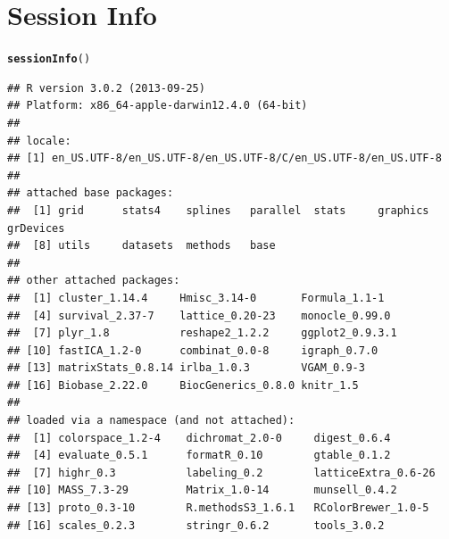 \documentclass[10pt,oneside]{article}\usepackage[]{graphicx}\usepackage[]{color}
\makeatletter
\newcommand{\hlstd}[1]{\textcolor[rgb]{0.345,0.345,0.345}{#1}}%
\newcommand{\hlkwd}[1]{\textcolor[rgb]{0.737,0.353,0.396}{\textbf{#1}}}%
\newenvironment{kframe}{%
 \def\at@end@of@kframe{}%
 \ifinner\ifhmode%
  \def\at@end@of@kframe{\end{minipage}}%
  \begin{minipage}{\columnwidth}%
 \fi\fi%
 \def\FrameCommand##1{\hskip\@totalleftmargin \hskip-\fboxsep
 \colorbox{shadecolor}{##1}\hskip-\fboxsep
     \hskip-\linewidth \hskip-\@totalleftmargin \hskip\columnwidth}%
 \MakeFramed {\advance\hsize-\width
   \@totalleftmargin\z@ \linewidth\hsize
   \@setminipage}}%
 {\par\unskip\endMakeFramed%
 \at@end@of@kframe}
\newenvironment{knitrout}{}{} %
\makeatother
\begin{document}
\section{Session Info}
\begin{knitrout}
\color{fgcolor}\begin{kframe}
\begin{alltt}
\hlkwd{sessionInfo}\hlstd{()}
\end{alltt}
\begin{verbatim}
## R version 3.0.2 (2013-09-25)
## Platform: x86_64-apple-darwin12.4.0 (64-bit)
## 
## locale:
## [1] en_US.UTF-8/en_US.UTF-8/en_US.UTF-8/C/en_US.UTF-8/en_US.UTF-8
## 
## attached base packages:
##  [1] grid      stats4    splines   parallel  stats     graphics  grDevices
##  [8] utils     datasets  methods   base     
## 
## other attached packages:
##  [1] cluster_1.14.4     Hmisc_3.14-0       Formula_1.1-1     
##  [4] survival_2.37-7    lattice_0.20-23    monocle_0.99.0    
##  [7] plyr_1.8           reshape2_1.2.2     ggplot2_0.9.3.1   
## [10] fastICA_1.2-0      combinat_0.0-8     igraph_0.7.0      
## [13] matrixStats_0.8.14 irlba_1.0.3        VGAM_0.9-3        
## [16] Biobase_2.22.0     BiocGenerics_0.8.0 knitr_1.5         
## 
## loaded via a namespace (and not attached):
##  [1] colorspace_1.2-4    dichromat_2.0-0     digest_0.6.4       
##  [4] evaluate_0.5.1      formatR_0.10        gtable_0.1.2       
##  [7] highr_0.3           labeling_0.2        latticeExtra_0.6-26
## [10] MASS_7.3-29         Matrix_1.0-14       munsell_0.4.2      
## [13] proto_0.3-10        R.methodsS3_1.6.1   RColorBrewer_1.0-5 
## [16] scales_0.2.3        stringr_0.6.2       tools_3.0.2
\end{verbatim}
\end{kframe}
\end{knitrout}




\end{document}
